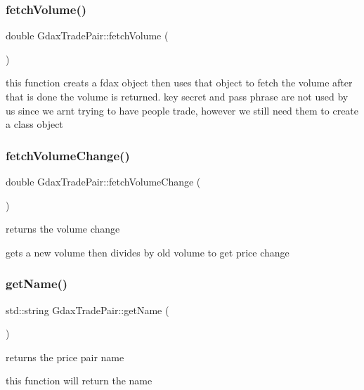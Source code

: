 \subsubsection{\texorpdfstring{fetch\+Volume()}{fetchVolume()}}
{\footnotesize\ttfamily double Gdax\+Trade\+Pair\+::fetch\+Volume (\begin{DoxyParamCaption}{ }\end{DoxyParamCaption})}

this function creats a fdax object then uses that object to fetch the volume after that is done the volume is returned. key secret and pass phrase are not used by us since we arnt trying to have people trade, however we still need them to create a class object \mbox{\label{class_gdax_trade_pair_ab4bc3b56207898507dd1ea0b2a4d3954}} 
\subsubsection{\texorpdfstring{fetch\+Volume\+Change()}{fetchVolumeChange()}}
{\footnotesize\ttfamily double Gdax\+Trade\+Pair\+::fetch\+Volume\+Change (\begin{DoxyParamCaption}{ }\end{DoxyParamCaption})}



returns the volume change 

gets a new volume then divides by old volume to get price change \mbox{\label{class_gdax_trade_pair_ac67b487345149920a4631b3b2517033f}} 
\subsubsection{\texorpdfstring{get\+Name()}{getName()}}
{\footnotesize\ttfamily std\+::string Gdax\+Trade\+Pair\+::get\+Name (\begin{DoxyParamCaption}{ }\end{DoxyParamCaption})}



returns the price pair name 

this function will return the name \mbox{\label{class_gdax_trade_pair_aaec623f9a4d7cb24ee924aa999bfc94a}} 

